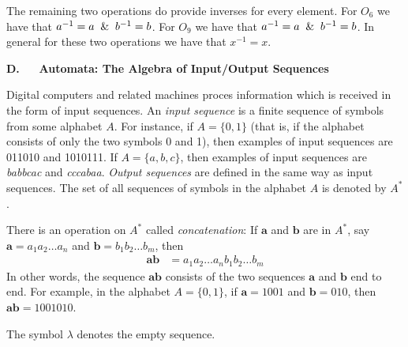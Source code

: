 \documentclass[twoside]{amsart}
\newcommand{\brk}{\vspace{5pt}}
\begin{document}
\begin{enumerate}[label=\textbf{\arabic*}, leftmargin=1em]
   The remaining two operations do
   provide inverses for every element. For $O_6$ we have that 
   $a^{-1} = a \And b^{-1} = b$. For $O_9$ we have that 
   $a^{-1} = a \And b^{-1} = b$. In general for these two operations
   we have that $x^{-1} = x$.

\end{enumerate}

\noindent \large\textbf{D. $\quad$ Automata: The Algebra of Input/Output
  Sequences}

\brk \noindent Digital computers and related machines proces information
which is received in the form of input sequences. An \emph{input
  sequence} is a finite sequence of symbols from some alphabet
$A$. For instance, if $A=\{0,1\}$ (that is, if the alphabet consists
of only the two symbols 0 and 1), then examples of input sequences are
011010 and 1010111. If $A=\{a,b,c\}$, then examples of input sequences
are \emph{babbcac} and \emph{cccabaa}. \emph{Output sequences} are
defined in the same way as input sequences. The set of all sequences
of symbols in the alphabet $A$ is denoted by $A^*$.

There is an operation on $A^*$ called \emph{concatenation}: If $\mathbf{a}$ and
$\mathbf{b}$ are in $A^*$, say $\mathbf{a} = a_1 a_2 \ldots a_n$ and
$\mathbf{b} = b_1 b_2 \ldots b_m$, then \begin{align*} \mathbf{ab} & = a_1 a_2
\ldots a_n b_1 b_2 \ldots b_m \end{align*} In other words, the sequence
$\mathbf{ab}$ consists of the two sequences $\mathbf{a}$ and $\mathbf{b}$ end
to end.  For example, in the alphabet $A=\{0,1\}$, if $\mathbf{a} = 1001$ and
$\mathbf{b} = 010$, then $\mathbf{ab} = 1001010$.

The symbol $\lambda$ denotes the empty sequence.
\end{document}
